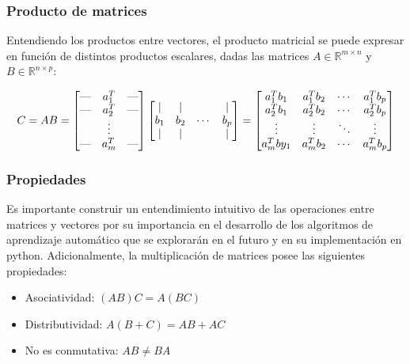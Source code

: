 \documentclass[10pt]{beamer}
\begin{document}
\begin{frame}
    \frametitle{Producto de matrices}
    Entendiendo los productos entre vectores, el producto matricial se puede expresar en función 
    de distintos productos escalares, dadas las matrices
    $A \in \mathbb{R}^{m\times n}$ y $B \in \mathbb{R}^{n\times p}$:

    \begin{equation}
        C = AB = \begin{bmatrix}
            \text{\textemdash} & a_1^T & \text{\textemdash} \\
            \text{\textemdash} & a_2^T & \text{\textemdash} \\
                  & \vdots &  \\
            \text{\textemdash} & a_m^T & \text{\textemdash}
            \end{bmatrix} \begin{bmatrix}
                | & | &   & | \\
                b_1 & b_2 & \cdots & b_p \\
                | & | &   & | 
            \end{bmatrix} = 
            \begin{bmatrix}
                a_1^Tb_1 & a_1^Tb_2 & \cdots & a_1^Tb_p \\
                a_2^Tb_1 & a_2^Tb_2 & \cdots & a_2^Tb_p \\
                \vdots & \vdots & \ddots & \vdots \\
                a_m^Tby_1 & a_m^Tb_2 & \cdots & a_m^Tb_p
            \end{bmatrix}
    \end{equation}
\end{frame}

\begin{frame}
    \frametitle{Propiedades}
    Es importante construir un entendimiento intuitivo de las operaciones entre matrices y vectores 
    por su importancia en el desarrollo de los algoritmos de aprendizaje automático que se explorarán 
    en el futuro y en su implementación en python. Adicionalmente, la multiplicación de matrices 
    posee las siguientes propiedades:
    \begin{itemize}
        \item Asociatividad: $(AB)C = A(BC)$
        \item Distributividad: $A(B + C) = AB + AC$
        \item No es conmutativa: $AB \neq BA$
    \end{itemize}
    

\end{frame}
\end{document}
